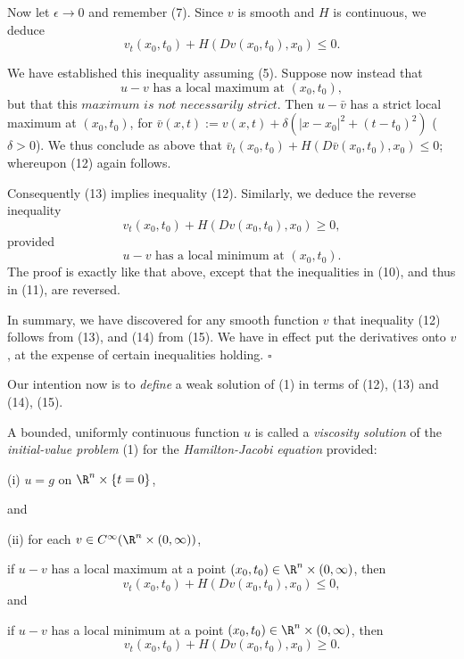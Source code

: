 \begin{remark}
Now let $\epsilon \to 0$ and remember (7). Since $v$ is smooth and $H$ is continuous, we deduce
\[
v_t(x_0, t_0) + H(Dv(x_0, t_0), x_0) \leq 0.
\tag{12}
\]

We have established this inequality assuming (5). Suppose now instead that
\[
u - v \text{ has a local maximum at }(x_0, t_0),
\tag{13}
\]
but that this $\textit{maximum is not necessarily strict}$. Then $u - \bar{v}$ has a strict local maximum at $(x_0, t_0)$, for $\bar{v}(x, t) := v(x, t) + \delta(|x - x_0|^2 + (t - t_0)^2)$ ($\delta > 0$). We thus conclude as above that $\bar{v}_t(x_0, t_0) + H(D\bar{v}(x_0, t_0), x_0) \leq 0$; whereupon (12) again follows.

Consequently (13) implies inequality (12). Similarly, we deduce the reverse inequality
\[
v_t(x_0, t_0) + H(Dv(x_0, t_0), x_0) \geq 0,
\tag{14}
\]
provided
\[
u - v \text{ has a local minimum at }(x_0, t_0).
\tag{15}
\]
The proof is exactly like that above, except that the inequalities in (10), and thus in (11), are reversed.

In summary, we have discovered for any smooth function $v$ that inequality (12) follows from (13), and (14) from (15). We have in effect put the derivatives onto $v$, at the expense of certain inequalities holding. $\square$
\end{remark}

Our intention now is to \textit{define} a weak solution of (1) in terms of (12), (13) and (14), (15).

\begin{definition}
\label{def:viscosity-solution-cauchy-problem}
A bounded, uniformly continuous function $u$ is called a \textit{viscosity solution} of the \textit{initial-value problem} (1) for the \textit{Hamilton-Jacobi equation} provided:

(i) $u = g$ on $\R^n \times \{t = 0\}$,

and

(ii) for each $v \in C^\infty(\R^n \times (0,\infty))$,

if $u - v$ has a local maximum at a point $(x_0, t_0) \in \R^n \times (0,\infty)$, then
\[
v_t(x_0, t_0) + H(Dv(x_0, t_0), x_0) \leq 0,
\tag{16}
\]
and

if $u - v$ has a local minimum at a point $(x_0, t_0) \in \R^n \times (0,\infty)$, then
\[
v_t(x_0, t_0) + H(Dv(x_0, t_0), x_0) \geq 0.
\tag{17}
\]
\end{definition}

